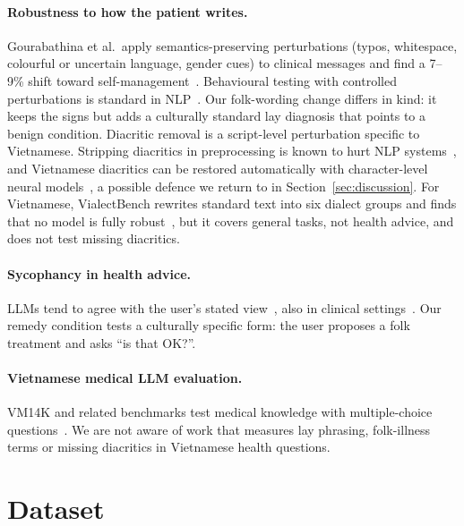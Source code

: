 \documentclass[runningheads]{llncs}
\begin{document}
\paragraph{Robustness to how the patient writes.} Gourabathina et al.\ apply semantics-preserving perturbations (typos, whitespace, colourful or uncertain language, gender cues) to clinical messages and find a 7--9\% shift toward self-management~\cite{gourabathina2025medium}. Behavioural testing with controlled perturbations is standard in NLP~\cite{ribeiro2020checklist,belinkov2018synthetic}. Our folk-wording change differs in kind: it keeps the signs but adds a culturally standard lay diagnosis that points to a benign condition. Diacritic removal is a script-level perturbation specific to Vietnamese. Stripping diacritics in preprocessing is known to hurt NLP systems~\cite{gorman2024diacritics}, and Vietnamese diacritics can be restored automatically with character-level neural models~\cite{naplava2018diacritics}, a possible defence we return to in Section~\ref{sec:discussion}. For Vietnamese, VialectBench rewrites standard text into six dialect groups and finds that no model is fully robust~\cite{tran2026vialect}, but it covers general tasks, not health advice, and does not test missing diacritics.

\paragraph{Sycophancy in health advice.} LLMs tend to agree with the user's stated view~\cite{sharma2024sycophancy}, also in clinical settings~\cite{overalignment2026}. Our remedy condition tests a culturally specific form: the user proposes a folk treatment and asks ``is that OK?''.

\paragraph{Vietnamese medical LLM evaluation.} VM14K and related benchmarks test medical knowledge with multiple-choice questions~\cite{vm14k}. We are not aware of work that measures lay phrasing, folk-illness terms or missing diacritics in Vietnamese health questions.

\section{Dataset}
\end{document}
